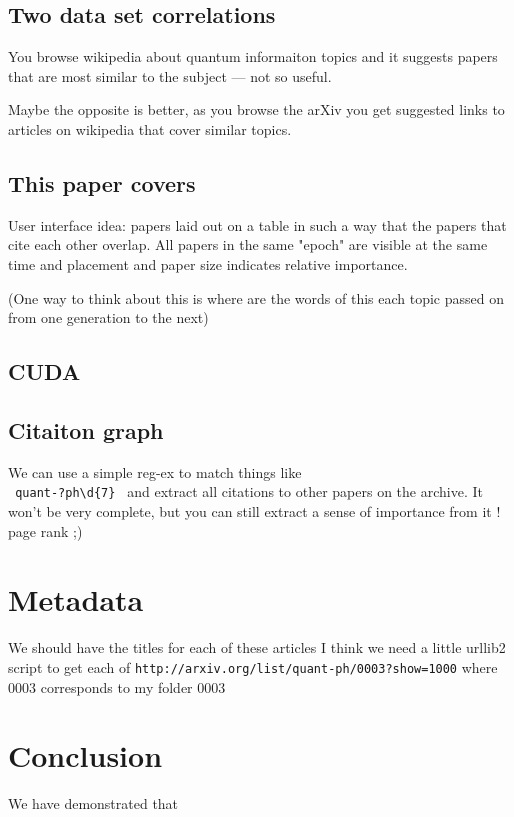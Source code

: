 \documentclass[11pt]{article}
\begin{document}
    \subsection{Two data set correlations}

        You browse wikipedia about quantum informaiton topics and it suggests
        papers that are most similar to the subject --- not so useful.

        Maybe the opposite is better, as you browse the arXiv you get suggested
        links to articles on wikipedia that cover similar topics.




	
	\subsection{This paper covers}
	
		User interface idea: papers laid out on a table in such a way that the papers that
		cite each other overlap. All papers in the same "epoch" are visible at the same time
		and placement and paper size indicates relative importance.
		
		(One way to think about this is where are the words of this each topic passed on from one generation
		to the next)
		 
		
	\subsection{CUDA }
			
    \subsection{Citaiton graph}
        We can use a simple reg-ex to match things like \\
        \verb| quant-?ph\d{7} | and extract all citations to other
        papers on the archive.
        It won't be very complete, but you can still extract a sense 
        of importance from it !
        page rank ;)

    \section{Metadata}
        We should have the titles for each of these articles I think
        we need a little urllib2 script to get each of
        \verb|http://arxiv.org/list/quant-ph/0003?show=1000|
        where 0003 corresponds to my folder 0003 


\section{Conclusion}

    We have demonstrated that     



\end{document}
